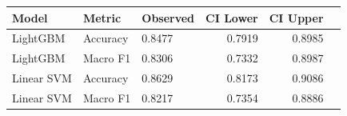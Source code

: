 \begin{tabular}{lllrrr}
\toprule
Model & Metric & Observed & CI Lower & CI Upper \\
\midrule
    LightGBM & Accuracy & 0.8477 & 0.7919 & 0.8985 \\
    LightGBM & Macro F1 & 0.8306 & 0.7332 & 0.8987 \\
    Linear SVM & Accuracy & 0.8629 & 0.8173 & 0.9086 \\
    Linear SVM & Macro F1 & 0.8217 & 0.7354 & 0.8886 \\
\bottomrule
\end{tabular}
